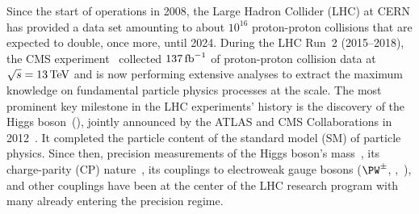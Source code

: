 \documentclass[a4paper,11pt]{article}
\newcommand{\Pb}{{{\Pqb}}\xspace}
\newcommand{\Pt}{{{\Pqt}}\xspace}
\newcommand{\Ps}{{{\Pqs}}\xspace}
\newcommand{\Pc}{{{\Pqc}}\xspace}
\newcommand{\Pd}{{{\Pqd}}\xspace}
\newcommand{\Pu}{{{\Pqu}}\xspace}
\begin{document}
Since the start of operations in 2008, the Large Hadron Collider (LHC) at CERN has provided a data set amounting to about $10^{16}$ proton-proton collisions that are expected to double, once more, until 2024.
During the LHC Run~2 (2015--2018), the CMS experiment~\cite{CMS_ex} collected  $137\mbox{\ensuremath{\,\text{fb}^{-1}}}$ of proton-proton collision data at $\sqrt{s}=13\,\text{Te\hspace{-.08em}V}$ and is now performing extensive analyses to extract the maximum knowledge on fundamental particle physics processes at the \TeV scale.
The most prominent key milestone in the LHC experiments' history is the discovery of the Higgs boson~(\PH), jointly announced by the ATLAS and CMS Collaborations in 2012~\cite{Aad:2012tfa,Chatrchyan:2012ufa}.
It completed the particle content of the standard model (SM) of particle physics. 
Since then, precision measurements of the Higgs boson's mass~\cite{CMS:2017dib,CMS:2020xrn}, its charge-parity (CP) nature~\cite{CMS:2019jdw,CMS:2020cga}, its couplings to electroweak gauge bosons ($\PW^{\pm}$, \PZ,~\Pgg), and other couplings have been at the center of the LHC research program with many already entering the precision regime.

\end{document}
